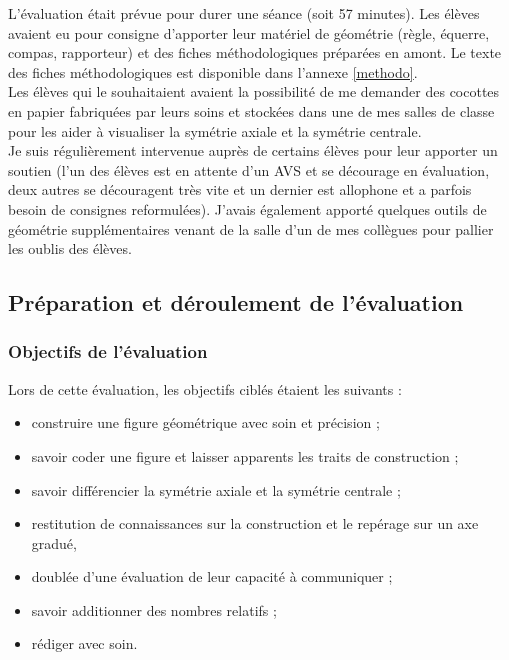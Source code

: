 L'évaluation était prévue pour durer une séance (soit 57 minutes). Les élèves avaient eu pour consigne d'apporter leur matériel de géométrie (règle, équerre, compas, rapporteur) et des fiches méthodologiques préparées en amont. Le texte des fiches méthodologiques est disponible dans l'annexe \ref{methodo}.\\

Les élèves qui le souhaitaient avaient la possibilité de me demander des cocottes en papier fabriquées par leurs soins et stockées dans une de mes salles de classe pour les aider à visualiser la symétrie axiale et la symétrie centrale.\\

Je suis régulièrement intervenue auprès de certains élèves pour leur apporter un soutien (l'un des élèves est en attente d'un AVS et se décourage en évaluation, deux autres se découragent très vite et un dernier est allophone et a parfois besoin de consignes reformulées). J'avais également apporté quelques outils de géométrie supplémentaires venant de la salle d'un de mes collègues pour pallier les oublis des élèves.

\newpage
\subsection{Préparation et déroulement de l'évaluation}
\subsubsection*{Objectifs de l'évaluation}\label{prep}
Lors de cette évaluation, les objectifs ciblés étaient les suivants :
\begin{itemize}
    \item construire une figure géométrique avec soin et précision ;
    \item savoir coder une figure et laisser apparents les traits de construction ;
    \item savoir différencier la symétrie axiale et la symétrie centrale ;
    \item restitution de connaissances sur la construction et le repérage sur un axe gradué,
    \item doublée d'une évaluation de leur capacité à communiquer ;
    \item savoir additionner des nombres relatifs ;
    \item rédiger avec soin.
\end{itemize}

